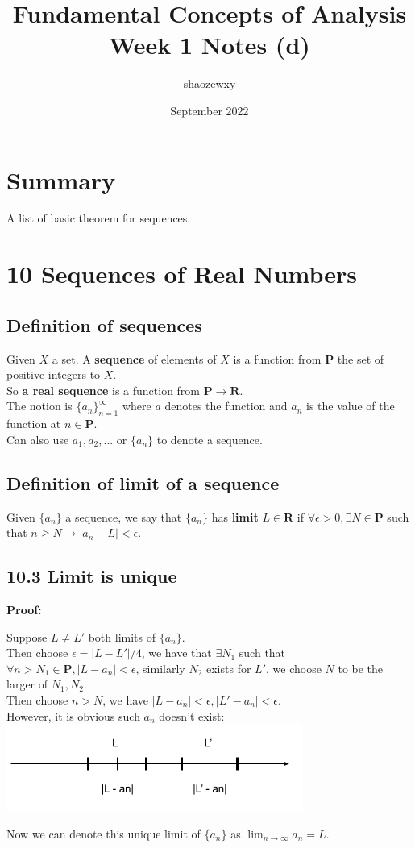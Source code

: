 \documentclass{article}
\title{Fundamental Concepts of Analysis\\
\large{Week 1 Notes (d)}}
\author{shaozewxy }
\date{September 2022}
\begin{document}
\maketitle
\section*{Summary}
A list of basic theorem for sequences.
\section*{10 Sequences of Real Numbers}
\subsection*{Definition of sequences}
Given $X$ a set. A \textbf{sequence} of elements of $X$ is a function from $\mathbf{P}$ the set of positive integers to $X$.\\
So \textbf{a real sequence} is a function from $\mathbf{P} \rightarrow \mathbf{R}$.\\
The notion is $\{a_n\}_{n=1}^{\infty}$ where $a$ denotes the function and $a_n$ is the value of the function at $n \in \mathbf{P}$.\\
Can also use $a_1, a_2, ...$ or $\{a_n\}$ to denote a sequence.
\subsection*{Definition of limit of a sequence}
Given $\{a_n\}$ a sequence, we say that $\{a_n\}$ has \textbf{limit} $L \in \mathbf{R}$ if $\forall \epsilon > 0, \exists N \in \mathbf{P}$ such that $n \geq N \rightarrow |a_n - L| < \epsilon$.
\subsection*{10.3 Limit is unique}
\textbf{Proof:}
\begin{addmargin}[1em]{0em}
    Suppose $L \neq L'$ both limits of $\{a_n\}$.\\
    Then choose $\epsilon = |L - L'|/4$, we have that $\exists N_1$ such that $\forall n > N_1 \in \mathbf{P}, |L - a_n| < \epsilon$, similarly $N_2$ exists for $L'$, we choose $N$ to be the larger of $N_1, N_2$.\\
    Then choose $n > N$, we have $|L - a_n| < \epsilon, |L' - a_n| < \epsilon$.\\
    However, it is obvious such $a_n$ doesn't exist:\\
    \includegraphics*[]{UniqueLimit.png}
\end{addmargin} 
Now we can denote this unique limit of $\{a_n\}$ as $\lim_{n \rightarrow \infty} a_n = L$.
\end{document}
